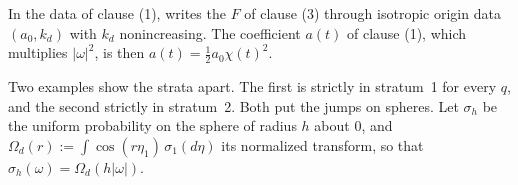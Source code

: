 In the data of clause (1),  writes the $F$ of clause (3)
through isotropic origin data $(a_0, k_d)$ with $k_d$ nonincreasing. The coefficient $a(t)$ of
clause (1), which multiplies $|\omega|^2$, is then $a(t) = \tfrac12a_0\chi(t)^2$.

Two examples show the strata apart. The first is strictly in stratum~1 for every $q$, and the
second strictly in stratum~2. Both put the jumps on spheres. Let $\sigma_h$ be the uniform
probability on the sphere of radius $h$ about $0$, and $\Omega_d(r) := \int\cos(r\eta_1)\,\sigma_1(d\eta)$
its normalized transform, so that $\widehat\sigma_h(\omega) = \Omega_d(h|\omega|)$.


